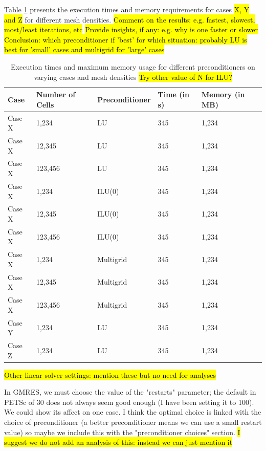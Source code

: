 \documentclass[sn-mathphys,Numbered]{sn-jnl}%
\begin{document}
Table \ref{tab:preconditioner} presents the execution times and memory requirements for cases \hl{X, Y and Z} for different mesh densities.
\hl{Comment on the results: e.g. fastest, slowest, most/least iterations, etc}
\hl{Provide insights, if any: e.g. why is one faster or slower}
\hl{Conclusion: which preconditioner if 'best' for which situation: probably LU is best for 'small' cases and multigrid for 'large' cases}
\begin{table}[htb]
	\centering
		\begin{tabular}{lllll}
			\hline
			Case & Number of Cells & Preconditioner & Time (in s) & Memory (in MB)  \\
			\hline 
			Case X & 1,234 & LU & 345 & 1,234  \\
			Case X & 12,345 & LU & 345 & 1,234  \\
			Case X & 123,456 & LU & 345 & 1,234  \\
			Case X & 1,234 & ILU(0) & 345 & 1,234  \\
			Case X & 12,345 & ILU(0) & 345 & 1,234  \\
			Case X & 123,456 & ILU(0) & 345 & 1,234  \\
			Case X & 1,234 & Multigrid & 345 & 1,234  \\
			Case X & 12,345 & Multigrid & 345 & 1,234  \\
			Case X & 123,456 & Multigrid & 345 & 1,234  \\
			Case Y & 1,234 & LU & 345 & 1,234  \\
			Case Z & 1,234 & LU & 345 & 1,234  \\
			\hline
		\end{tabular}
	\caption{Execution times and maximum memory usage for different preconditioners on varying cases and mesh densities \hl{Try other value of N for ILU?}}
	\label{tab:preconditioner}
\end{table}


\hl{Other linear solver settings: mention these but no need for analyses}

In GMRES, we must choose the value of the "restarts" parameter; the default in PETSc of 30 does not always seem good enough (I have been setting it to 100). We could show its affect on one case. I think the optimal choice is linked with the choice of preconditioner (a better preconditioner means we can use a small restart value) so maybe we include this with the "preconditioner choices" section.
\hl{I suggest we do not add an analysis of this: instead we can just mention it}
\end{document}
